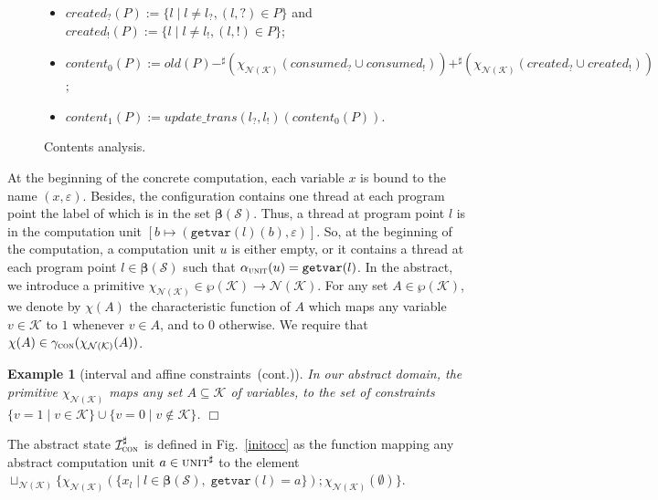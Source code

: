 \documentclass{article}
\newcommand{\bydef}{:=}
\newcommand{\boxexample}{$\Box$}
\newtheorem{example}[thm]{Example}
\newcommand{\rec}{?}
\newcommand{\eme}{!}
\newcommand{\System}{\mathcal{S}}
\newcommand{\Extract}{\mathbf{\beta}}
\newcommand{\lrec}{l_{\rec}}
\newcommand{\leme}{l_{\eme}}
\newcommand{\continued}{(cont.)}
\newcommand{\piunit}{\alpha_\computationunit}
\newcommand{\computationunit}{\textsc{unit}}
\newcommand{\abstractunit}{\textsc{unit}^{\sharp}}
\newcommand{\giveindex}{\texttt{getvar}}
\newcommand{\ainit}[1]{\mathcal{I}_{#1}^{\sharp}}
\newcommand{\var}{\mathcal{K}}
\newcommand{\numkey}{\textsc{con}}
\newcommand{\abstnum}{\mathcal{N}(\var)}
\newcommand{\cupnum}{\sqcup_{\abstnum}}
\newcommand{\xinum}{\chi_{\abstnum}}
\newcommand{\initnum}{\ainit{\numkey}}
\newcommand{\addnum}{+^{\sharp}}
\newcommand{\minnum}{-^{\sharp}}
\newcommand{\concnum}{\gamma_{\numkey}}
\newcommand{\countdom}{interval and affine constraints}
\newcommand{\ccount}{\countdom\ \continued}
\begin{document}
\begin{figure*}[p]
{\begin{minipage}{0.996\linewidth}
\begin{itemize}
\item $\textit{created}_{\rec}(P)\bydef\{l\;|\;l\not=l_{\rec}, (l,\rec)\in P\}$ and $\textit{created}_{\eme}(P)\bydef\{l\;|\;l\not=l_{\eme}, (l,\eme)\in P\}$;
\item $\textit{content}_0(P) \bydef \textit{old}(P) \minnum (\xinum(\textit{consumed}_\rec \cup \textit{consumed}_{\eme})) \addnum  (\xinum(\textit{created}_\rec \cup \textit{created}_{\eme}))$;
\item $\textit{content}_1(P) \bydef \textit{update\_trans}(\lrec,\leme)(\textit{content}_0(P))$.
\end{itemize}
\end{minipage}}
\caption{Contents analysis.}
\label{absocc}
\end{figure*}
At the beginning of the concrete computation, 
 each variable $x$ is bound to  the name $(x,\varepsilon)$. 
Besides, the configuration contains one thread at each program point the label of which is in the set $\Extract(\System)$. 
Thus, a thread at program point $l$ is in the computation unit $[b\mapsto (\giveindex(l)(b),\varepsilon)]$.
So, at the beginning of the computation, a computation unit $u$ is either empty, or it contains a thread at each program point $l\in\Extract(\System)$ such that $\piunit(u)=\giveindex(l)$. 
In the abstract, we introduce a primitive $\xinum\in\wp(\var)\rightarrow \abstnum$. For any set $A\in\wp(\var)$, we denote by $\chi(A)$ the characteristic function of $A$ which  maps any variable $v\in \var$ to $1$ whenever $v\in A$, and to $0$ otherwise. We require that $\chi(A)\in \concnum(\xinum(A))$.

\begin{example}[\ccount]
In our abstract domain, the primitive $\xinum$ maps any set $A\subseteq \var$ of variables, to the set of constraints $\{v = 1 \;|\;v\in \var\}\cup\{ v=0 \;|\; v\not\in \var\}$.
\boxexample\end{example}

The abstract state $\initnum$ is defined in Fig.~\ref{initocc} as the function 
mapping any abstract computation unit $a\in\abstractunit$ to the element  $\cupnum\{\xinum(\{x_l\;|\;l\in \Extract(\System),\;\giveindex(l)=a\});\xinum(\emptyset)\}$.
\end{document}
